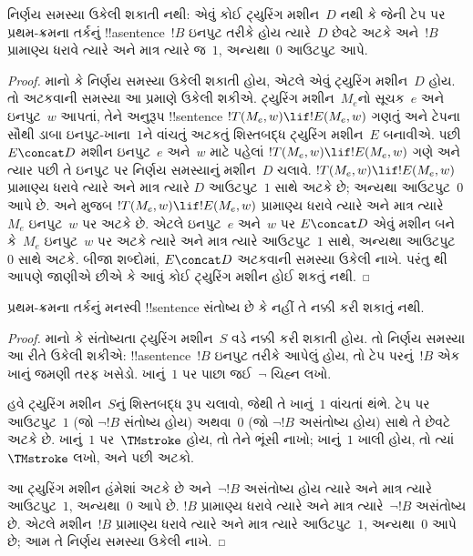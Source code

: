 \documentclass[../../../include/open-logic-section]{subfiles}
\begin{document}

\begin{thm}
નિર્ણય સમસ્યા ઉકેલી શકાતી નથી: એવું કોઈ ટ્યુરિંગ
મશીન~$D$ નથી કે જેની ટેપ પર પ્રથમ-ક્રમના તર્કનું
!!a{sentence}~$!B$ ઇનપુટ તરીકે હોય ત્યારે~$D$ છેવટે
અટકે અને~$!B$ પ્રામાણ્ય ધરાવે ત્યારે અને માત્ર ત્યારે
જ~$1$, અન્યથા~$0$ આઉટપુટ આપે.
\end{thm}

\begin{proof}
માનો કે નિર્ણય સમસ્યા ઉકેલી શકાતી હોય, એટલે એવું
ટ્યુરિંગ મશીન~$D$ હોય. તો અટકવાની સમસ્યા આ પ્રમાણે
ઉકેલી શકીએ. ટ્યુરિંગ મશીન~$M_e$નો સૂચક~$e$ અને
ઇનપુટ~$w$ આપતાં, તેને અનુરૂપ !!{sentence}
$!T(M_e, w) \lif !E(M_e, w)$ ગણતું અને ટેપના સૌથી
ડાબા ઇનપુટ-ખાના~$1$ને વાંચતું અટકતું શિસ્તબદ્ધ
ટ્યુરિંગ મશીન~$E$ બનાવીએ.
પછી $E \concat D$ મશીન ઇનપુટ~$e$ અને~$w$ માટે
પહેલાં $!T(M_e, w) \lif !E(M_e, w)$ ગણે અને ત્યાર પછી
તે ઇનપુટ પર નિર્ણય સમસ્યાનું મશીન~$D$ ચલાવે.
$!T(M_e, w) \lif !E(M_e, w)$ પ્રામાણ્ય ધરાવે ત્યારે
અને માત્ર ત્યારે $D$ આઉટપુટ~$1$ સાથે અટકે છે;
અન્યથા આઉટપુટ~$0$ આપે છે.
 અને
 મુજબ
$!T(M_e, w) \lif !E(M_e, w)$ પ્રામાણ્ય
ધરાવે ત્યારે અને માત્ર ત્યારે~$M_e$ ઇનપુટ~$w$ પર
અટકે છે. એટલે ઇનપુટ~$e$ અને~$w$ પર $E\concat D$
એવું મશીન બને કે~$M_e$ ઇનપુટ~$w$ પર અટકે ત્યારે
અને માત્ર ત્યારે આઉટપુટ~$1$ સાથે, અન્યથા આઉટપુટ~$0$
સાથે અટકે. બીજા શબ્દોમાં, $E \concat D$ અટકવાની
સમસ્યા ઉકેલી નાખે. પરંતુ
થી આપણે જાણીએ છીએ
કે આવું કોઈ ટ્યુરિંગ મશીન હોઈ શકતું નથી.
\end{proof}

\begin{cor}%
પ્રથમ-ક્રમના તર્કનું મનસ્વી !!{sentence} સંતોષ્ય છે કે
નહીં તે નક્કી કરી શકાતું નથી.
\end{cor}

\begin{proof}
  માનો કે સંતોષ્યતા ટ્યુરિંગ મશીન~$S$ વડે નક્કી કરી
  શકાતી હોય. તો નિર્ણય સમસ્યા આ રીતે ઉકેલી શકીએ:
  !!a{sentence}~$!B$ ઇનપુટ તરીકે આપેલું હોય, તો
  ટેપ પરનું~$!B$ એક ખાનું જમણી તરફ ખસેડો.
  ખાનું~$1$ પર પાછા જઈ~$\lnot$ ચિહ્ન લખો.

  હવે ટ્યુરિંગ મશીન~$S$નું શિસ્તબદ્ધ રૂપ ચલાવો,
  જેથી તે ખાનું~$1$ વાંચતાં થંભે. ટેપ પર આઉટપુટ~$1$
  (જો $\lnot !B$ સંતોષ્ય હોય) અથવા~$0$ (જો
  $\lnot !B$ અસંતોષ્ય હોય) સાથે તે છેવટે અટકે છે.
  ખાનું~$1$ પર~$\TMstroke$ હોય, તો તેને ભૂંસી નાખો;
  ખાનું~$1$ ખાલી હોય, તો ત્યાં~$\TMstroke$ લખો,
  અને પછી અટકો.

  આ ટ્યુરિંગ મશીન હંમેશાં અટકે છે અને~$\lnot !B$
  અસંતોષ્ય હોય ત્યારે અને માત્ર ત્યારે આઉટપુટ~$1$,
  અન્યથા~$0$ આપે છે. $!B$ પ્રામાણ્ય ધરાવે ત્યારે
  અને માત્ર ત્યારે~$\lnot !B$ અસંતોષ્ય છે. એટલે
  મશીન~$!B$ પ્રામાણ્ય ધરાવે ત્યારે અને માત્ર ત્યારે
  આઉટપુટ~$1$, અન્યથા~$0$ આપે છે; આમ તે નિર્ણય
  સમસ્યા ઉકેલી નાખે.
\end{proof}
\end{document}
